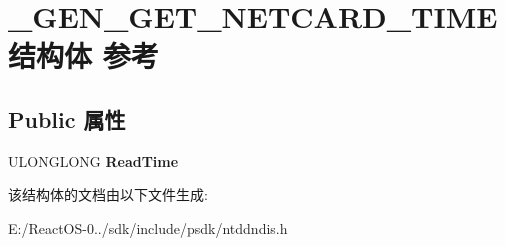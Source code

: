 \hypertarget{struct___g_e_n___g_e_t___n_e_t_c_a_r_d___t_i_m_e}{}\section{\+\_\+\+G\+E\+N\+\_\+\+G\+E\+T\+\_\+\+N\+E\+T\+C\+A\+R\+D\+\_\+\+T\+I\+M\+E结构体 参考}
\label{struct___g_e_n___g_e_t___n_e_t_c_a_r_d___t_i_m_e}
\subsection*{Public 属性}
\begin{DoxyCompactItemize}
\item 
\mbox{\label{struct___g_e_n___g_e_t___n_e_t_c_a_r_d___t_i_m_e_aab980562625fa4aadd6906ac0b4d6237}} 
U\+L\+O\+N\+G\+L\+O\+NG {\bfseries Read\+Time}
\end{DoxyCompactItemize}


该结构体的文档由以下文件生成\+:\begin{DoxyCompactItemize}
\item 
E\+:/\+React\+O\+S-\/0../sdk/include/psdk/ntddndis.\+h\end{DoxyCompactItemize}
